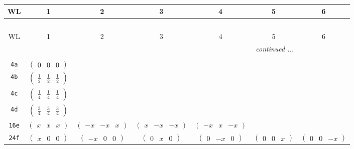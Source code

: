 \documentclass[fleqn,9pt,landscape]{jsarticle}
\begin{document}
\begin{center}
\renewcommand{\arraystretch}{1.2}
\begin{longtable}{ccccccc}
 \hline \hline
WL & 1 & 2 & 3 & 4 & 5 & 6 \\ \hline \endfirsthead

\multicolumn{6}{l}{\tablename\ \thetable{}} \\
 \hline \hline
WL & 1 & 2 & 3 & 4 & 5 & 6 \\ \hline \endhead

 \hline \hline
\multicolumn{6}{r}{\footnotesize\it continued ...} \\ \endfoot

 \hline \hline
\multicolumn{6}{r}{} \\ \endlastfoot

{\tt 4a} & $ \begin{pmatrix} 0 & 0 & 0 \end{pmatrix} $ & $  $ & $  $ & $  $ & $  $ & $  $ \\ \hline
{\tt 4b} & $ \begin{pmatrix} \frac{1}{2} & \frac{1}{2} & \frac{1}{2} \end{pmatrix} $ & $  $ & $  $ & $  $ & $  $ & $  $ \\ \hline
{\tt 4c} & $ \begin{pmatrix} \frac{1}{4} & \frac{1}{4} & \frac{1}{4} \end{pmatrix} $ & $  $ & $  $ & $  $ & $  $ & $  $ \\ \hline
{\tt 4d} & $ \begin{pmatrix} \frac{3}{4} & \frac{3}{4} & \frac{3}{4} \end{pmatrix} $ & $  $ & $  $ & $  $ & $  $ & $  $ \\ \hline
{\tt 16e} & $ \begin{pmatrix} x & x & x \end{pmatrix} $ & $ \begin{pmatrix} - x & - x & x \end{pmatrix} $ & $ \begin{pmatrix} x & - x & - x \end{pmatrix} $ & $ \begin{pmatrix} - x & x & - x \end{pmatrix} $ & $  $ & $  $ \\ \hline
{\tt 24f} & $ \begin{pmatrix} x & 0 & 0 \end{pmatrix} $ & $ \begin{pmatrix} - x & 0 & 0 \end{pmatrix} $ & $ \begin{pmatrix} 0 & x & 0 \end{pmatrix} $ & $ \begin{pmatrix} 0 & - x & 0 \end{pmatrix} $ & $ \begin{pmatrix} 0 & 0 & x \end{pmatrix} $ & $ \begin{pmatrix} 0 & 0 & - x \end{pmatrix} $ \\ \hline

\end{longtable}
\end{center}
\end{document}
